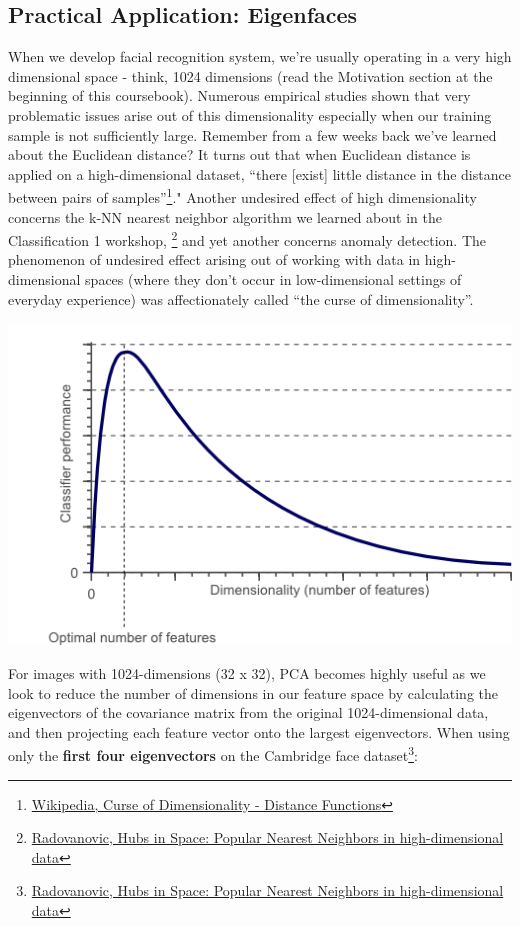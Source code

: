 \documentclass[]{article}
\begin{document}
\hypertarget{practical-application-eigenfaces}{%
\subsection{Practical Application:
Eigenfaces}\label{practical-application-eigenfaces}}

When we develop facial recognition system, we're usually operating in a
very high dimensional space - think, 1024 dimensions (read the
Motivation section at the beginning of this coursebook). Numerous
empirical studies shown that very problematic issues arise out of this
dimensionality especially when our training sample is not sufficiently
large. Remember from a few weeks back we've learned about the Euclidean
distance? It turns out that when Euclidean distance is applied on a
high-dimensional dataset, ``there {[}exist{]} little distance in the
distance between pairs of samples''\footnote{\href{https://en.wikipedia.org/wiki/Curse_of_dimensionality\#Distance_functions}{Wikipedia,
  Curse of Dimensionality - Distance Functions}}." Another undesired
effect of high dimensionality concerns the k-NN nearest neighbor
algorithm we learned about in the Classification 1 workshop, \footnote{\href{http://www.jmlr.org/papers/volume11/radovanovic10a/radovanovic10a.pdf}{Radovanovic,
  Hubs in Space: Popular Nearest Neighbors in high-dimensional data}}
and yet another concerns anomaly detection. The phenomenon of undesired
effect arising out of working with data in high-dimensional spaces
(where they don't occur in low-dimensional settings of everyday
experience) was affectionately called ``the curse of dimensionality''.

\includegraphics{assets/curseofdim.png}

For images with 1024-dimensions (32 x 32), PCA becomes highly useful as
we look to reduce the number of dimensions in our feature space by
calculating the eigenvectors of the covariance matrix from the original
1024-dimensional data, and then projecting each feature vector onto the
largest eigenvectors. When using only the \textbf{first four
eigenvectors} on the Cambridge face dataset\footnote{\href{http://www.jmlr.org/papers/volume11/radovanovic10a/radovanovic10a.pdf}{Radovanovic,
  Hubs in Space: Popular Nearest Neighbors in high-dimensional data}}:
\end{document}
